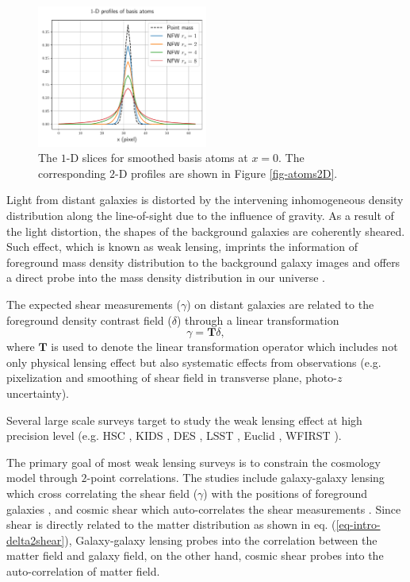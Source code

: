 \documentclass[twocolumn]{aastex62}
\begin{document}
\begin{figure}
 \includegraphics[width=0.5\textwidth]{nfwlet-atom-1D.pdf}
 \caption{The $1$-D slices for smoothed basis atoms at $x=0$. The corresponding $2$-D profiles are shown in Figure 
        \ref{fig-atoms2D}.} \label{fig-atoms1D}
\end{figure}

Light from distant galaxies is distorted by the intervening inhomogeneous density distribution along the line-of-sight
due to the influence of gravity. As a result of the light distortion, the shapes of the background galaxies are coherently
sheared. Such effect, which is known as weak lensing, imprints the information of foreground mass density distribution
to the background galaxy images and offers a direct probe into the mass density distribution in our universe
\citep[see][for recent reviews]{revKilbinger15,revRachel17}.

The expected shear measurements ($\gamma$) on distant galaxies are related to the 
foreground density contrast field ($\delta$) through a linear transformation
\begin{equation} \label{eq-intro-delta2shear}
 \gamma=\mathbf{T} \delta,
\end{equation}
where $\mathbf{T}$ is used to denote the linear transformation operator which includes not only physical lensing effect
but also systematic effects from observations (e.g. pixelization and smoothing of shear field in
transverse plane, photo-$z$ uncertainty).

Several large scale surveys target to study the weak lensing effect at high precision level (e.g. HSC \citep{HSC1-data}, KIDS
\citep{KIDS13}, DES \citep{DES05}, LSST \citep{LSSTScienceBook}, Euclid \citep{Euclid2011}, WFIRST \citep{WFIRST15}).

The primary goal of most weak lensing surveys is to constrain the cosmology model through $2$-point correlations. The studies
include galaxy-galaxy lensing which cross correlating the shear field ($\gamma$) with the positions of foreground galaxies
\citep{gglens-GAMA-Han2014,gglens-BossCFHTMore2015,gglens-DES1},
and cosmic shear which auto-correlates the shear measurements
\citep{cosmicShearRealKids450,cosmicShear-DES1,cosmicShear_HSC1_Chiaki2019,cosmicShear_HSC1_Hamana2019}.
Since shear is directly related to the matter distribution as shown in eq. (\ref{eq-intro-delta2shear}), Galaxy-galaxy lensing
probes into the correlation between the matter field and galaxy field, on the other hand, cosmic shear probes into the
auto-correlation of matter field.
\end{document}
